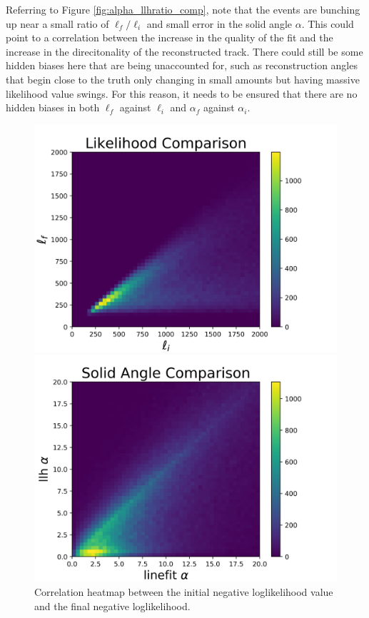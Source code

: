 Referring to Figure \ref{fig:alpha_llhratio_comp}, note that the events are bunching up near a small ratio of $\ell_{f}/\ell_{i}$ and small error in the solid angle $\alpha$. This could point to a correlation between the increase in the quality of the fit and the increase in the direcitonality of the reconstructed track. There could still be some hidden biases here that are being unaccounted for, such as reconstruction angles that begin close to the truth only changing in small amounts but having massive likelihood value swings. For this reason, it needs to be ensured that there are no hidden biases in both $\ell_{f}$ against $\ell_{i}$ and $\alpha_{f}$ against $\alpha_{i}$.

\begin{figure}[ht]
  \begin{minipage}[b]{0.48\linewidth}
    \centering
    \includegraphics[width=\textwidth]{./Figures/reco_plots/llhratio_comp_heat.png}
    \caption{Correlation heatmap between the initial negative loglikelihood value and the final negative loglikelihood.}
    \label{subfig:llh_heat}
  \end{minipage}
  \hspace{0.1cm}
  \begin{minipage}[b]{0.48\linewidth}
    \centering
    \includegraphics[width=\textwidth]{./Figures/reco_plots/alpha_dist_comp_heat.png}

\end{minipage}
\end{figure}
